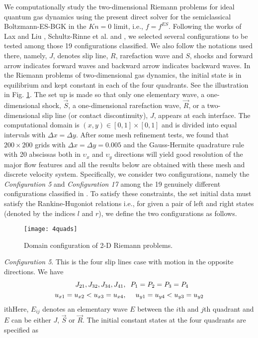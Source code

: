 \documentclass{rsproca}%
\begin{document}
We computationally study the two-dimensional Riemann problems for ideal quantum gas dynamics using the present direct solver for the semiclassical Boltzmann-ES-BGK in the $Kn =0$ limit, i.e., $f=f^{ES}$.  Following the works of Lax and Liu \cite{Laxliu95}, Schultz-Rinne et al. \cite{schultzrinne} and  \cite{ZhangZheng90}, we selected several configurations to be tested among those 19 configurations classified.  We also follow the notations used there, namely, $J$, denotes slip line, $R$, rarefaction wave and $S$, shocks and forward arrow indicates forward waves and backward arrow indicates backward waves. In the Riemann problems of two-dimensional gas dynamics, the initial state is in equilibrium and kept constant in each of the four quadrants. See the illustration in Fig. \ref{fig:quadrants}.
The set up is made so that only one elementary wave, a one-dimensional shock, $\vec{S}$, a one-dimensional rarefaction wave, $\vec{R}$, or a two-dimensional slip line (or contact discontinuity), $J$, appears at each interface.  The computational domain is $(x,y) \in [0,1]\times [0,1]$ and is divided into equal intervals with $\Delta x= \Delta y$.  After some mesh refinement tests, we found that $200\times 200$ grids with $\Delta x=\Delta y=0.005$ and the Gauss-Hermite quadrature rule with 20 abscissas both in $\upsilon_x$ and $\upsilon_y$ directions will yield good resolution of the major flow features and all the results below are obtained with these mesh and discrete velocity system.
Specifically, we consider two configurations, namely the \emph{Configuration 5} and \emph{Configuration 17} among the 19 genuinely different configurations classified in \cite{Laxliu95}\cite{schultzrinne}\cite{ZhangZheng90}. To satisfy these constraints, the set initial data must satisfy the Rankine-Hugoniot relations i.e., for given a pair of left and right states (denoted by the indices $l$ and $r$), we define the two configurations as follows.\\

\begin{figure}
	\centering
	\texttt{[image: 4quads]}
  \caption{Domain configuration of 2-D Riemann problems.}
  \label{fig:quadrants}
\end{figure}

{\em Configuration 5}.
This is the four slip lines case with motion in the opposite directions.  We have
\begin{align*}
{J_{21}},J_{32},J_{34},{J_{41}},&\hspace{0.1in}P_1=P_2=P_3=P_4\\
u_{x1}=u_{x2}<u_{x3}=u_{x4},&\hspace{0.2in}u_{y1}=u_{y4}<u_{y3}=u_{y2}
\end{align*}
ithHere, $E_{ij}$ denotes an elementary wave $E$ between the $i$th and $j$th quadrant and$E$ can be either $J$, $\vec{S}$ or $\vec{R}$.  The initial constant states at the four quadrants are specified as
\end{document}
